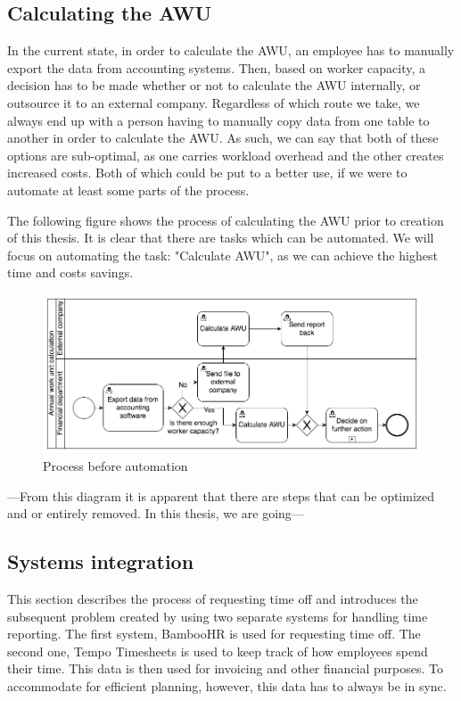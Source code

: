 \documentclass[12pt,oneside]{fithesis2}
\begin{document}
    \subsection{Calculating the AWU}
    In the current state, in order to calculate the AWU, an employee has to manually export the data from accounting systems. Then, based on worker capacity, a decision has to be made whether or not to calculate the AWU internally, or outsource it to an external company. Regardless of which route we take, we always end up with a person having to manually copy data from one table to another in order to calculate the AWU. As such, we can say that both of these options are sub-optimal, as one carries workload overhead and the other creates increased costs. Both of which could be put to a better use, if we were to automate at least some parts of the process.
    
    The following figure shows the process of calculating the AWU prior to creation of this thesis. It is clear that there are tasks which can be automated. We will focus on automating the task: "Calculate AWU", as we can achieve the highest time and costs savings.
    \begin{figure}[htp]
        \centering
        \includegraphics[width=\textwidth]{before_automation.png}
        \caption{Process before automation}
        \label{fig:before_automation}
    \end{figure}
    
    ---From this diagram it is apparent that there are steps that can be optimized and or entirely removed. In this thesis, we are going---
    
    \subsection{Systems integration}
    This section describes the process of requesting time off and introduces the subsequent problem created by using two separate systems for handling time reporting. The first system, BambooHR is used for requesting time off. The second one, Tempo Timesheets is used to keep track of how employees spend their time. This data is then used for invoicing and other financial purposes. To accommodate for efficient planning, however, this data has to always be in sync.
    
\end{document}
